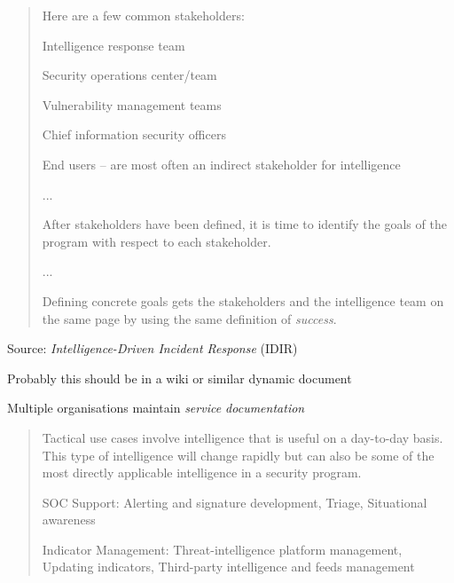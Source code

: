 \documentclass[Screen16to9,17pt]{foils}
\begin{document}


\begin{quote}
Here are a few common stakeholders:
\begin{list2}
\item Intelligence response team
\item Security operations center/team
\item Vulnerability management teams
\item Chief information security officers
\item End users -- are most often an indirect stakeholder for intelligence
\end{list2}
...

After stakeholders have been defined, it is time to identify the goals of the program
with respect to each stakeholder.

...

Defining concrete goals gets the stakeholders and the intelligence team on the same
page by using the same definition of \emph{success}.
\end{quote}
Source: \emph{Intelligence-Driven Incident Response} (IDIR)



\begin{list2}
\item Probably this should be in a wiki or similar dynamic document
\item Multiple organisations maintain \emph{service documentation}
\end{list2}




\begin{quote}
Tactical use cases involve intelligence that is useful on a day-to-day basis. This type of
intelligence will change rapidly but can also be some of the most directly applicable
intelligence in a security program.

\begin{list2}
\item SOC Support: Alerting and signature development, Triage, Situational awareness
\item Indicator Management: Threat-intelligence platform management, Updating indicators, Third-party intelligence and feeds management
\end{list2}
\end{quote}
\end{document}
